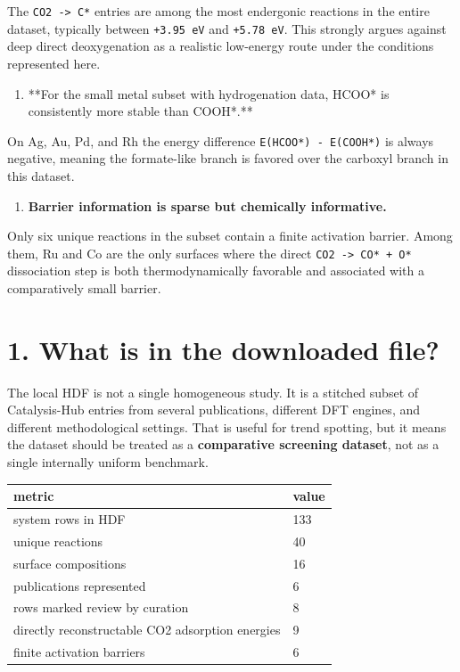 \documentclass[11pt]{article}
\begin{document}
The \texttt{CO2 -> C*} entries are among the most endergonic reactions in the entire dataset, typically between \texttt{+3.95 eV} and \texttt{+5.78 eV}. This strongly argues against deep direct deoxygenation as a realistic low-energy route under the conditions represented here.
\begin{enumerate}
\item **For the small metal subset with hydrogenation data, HCOO* is consistently more stable than COOH*.**
\end{enumerate}
On Ag, Au, Pd, and Rh the energy difference \texttt{E(HCOO*) - E(COOH*)} is always negative, meaning the formate-like branch is favored over the carboxyl branch in this dataset.
\begin{enumerate}
\item \textbf{Barrier information is sparse but chemically informative.}
\end{enumerate}
Only six unique reactions in the subset contain a finite activation barrier. Among them, Ru and Co are the only surfaces where the direct \texttt{CO2 -> CO* + O*} dissociation step is both thermodynamically favorable and associated with a comparatively small barrier.
\section{1. What is in the downloaded file?}
The local HDF is not a single homogeneous study. It is a stitched subset of Catalysis-Hub entries from several publications, different DFT engines, and different methodological settings. That is useful for trend spotting, but it means the dataset should be treated as a \textbf{comparative screening dataset}, not as a single internally uniform benchmark.
\begin{center}
\small
\begin{tabular}{| p{} | p{} |}
\hline
metric & value \\
\hline
system rows in HDF & 133 \\
\hline
unique reactions & 40 \\
\hline
surface compositions & 16 \\
\hline
publications represented & 6 \\
\hline
rows marked review by curation & 8 \\
\hline
directly reconstructable CO2 adsorption energies & 9 \\
\hline
finite activation barriers & 6 \\
\hline
\end{tabular}
\normalsize
\end{center}
\end{document}
